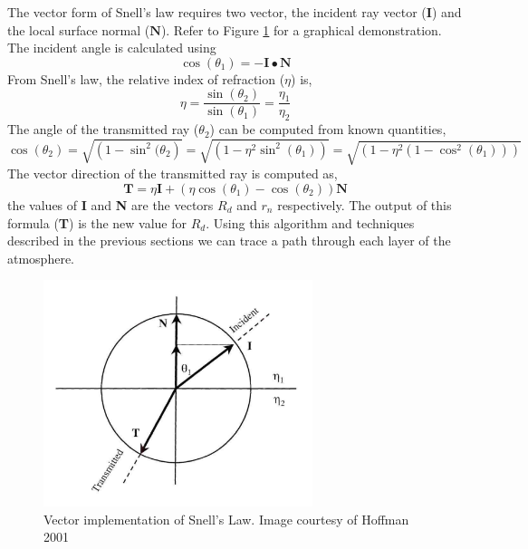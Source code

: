 The vector form of Snell's law requires two vector, the incident ray vector ($\textbf{I}$) and the local surface normal ($\textbf{N}$). Refer to Figure \ref{fig:incident} for a graphical demonstration. The incident angle is calculated using
\begin{equation}
\cos (\theta_1) = -\textbf{I} \bullet \textbf{N}
\end{equation}
From Snell's law, the relative index of refraction ($\eta$) is,
\begin{equation}
\eta = \frac{\sin (\theta_2)}{\sin(\theta_1)} = \frac{\eta_1}{\eta_2}
\end{equation}
The angle of the transmitted ray ($\theta_2$) can be computed from known quantities,
\begin{equation}
\cos(\theta_2) = \sqrt{\left(1-\sin^2(\theta_2\right)}= \sqrt{\left(1-\eta^2\sin^2(\theta_1)\right)} =  \sqrt{\left(1-\eta^2(1-\cos^2(\theta_1))\right)}
\end{equation}
The vector direction of the transmitted ray is computed as,
\begin{equation}
\textbf{T} = \eta\textbf{I} + (\eta\cos(\theta_1) -\cos (\theta_2))\textbf{N}
\end{equation}
the values of \textbf{I} and \textbf{N} are the vectors $R_d$ and $r_n$ respectively. The output of this formula (\textbf{T}) is the new value for $R_d$. Using this algorithm and techniques described in the previous sections we can trace a path through each layer of the atmosphere.

\begin{figure}[!p]
    \centering
	\includegraphics[width=0.7\textwidth]{./rtm/incident.png}
	\caption{Vector implementation of Snell's Law. Image courtesy of Hoffman 2001 \cite{Hoffman-thesis}}
		\label{fig:incident}
\end{figure}
\clearpage
